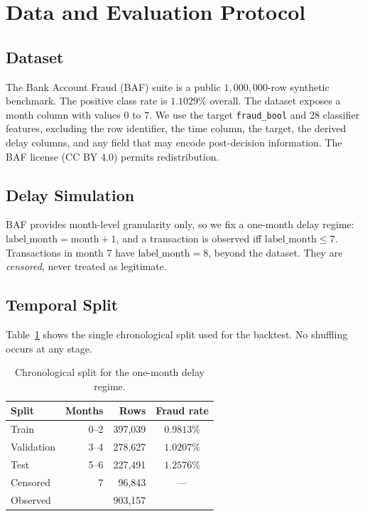 \documentclass[conference]{IEEEtran}
\begin{document}
\section{Data and Evaluation Protocol}
\label{sec:data}

\subsection{Dataset}

The Bank Account Fraud (BAF) suite \cite{jesus2022} is a public
$1{,}000{,}000$-row synthetic benchmark. The positive class rate is
$1.1029\%$ overall. The dataset exposes a month column with values $0$ to
$7$. We use the target \texttt{fraud\_bool} and 28 classifier features,
excluding the row identifier, the time column, the target, the derived delay
columns, and any field that may encode post-decision information. The BAF
license (CC BY 4.0) permits redistribution.

\subsection{Delay Simulation}

BAF provides month-level granularity only, so we fix a one-month delay
regime: $\text{label\_month} = \text{month} + 1$, and a transaction is
observed iff $\text{label\_month} \leq 7$. Transactions in month 7 have
$\text{label\_month} = 8$, beyond the dataset. They are \emph{censored},
never treated as legitimate.

\subsection{Temporal Split}

Table~\ref{tab:split} shows the single chronological split used for the
backtest. No shuffling occurs at any stage.

\begin{table}[!t]
\caption{Chronological split for the one-month delay regime.}
\label{tab:split}
\centering
\small
\begin{tabular}{lrrc}
\toprule
Split & Months & Rows & Fraud rate \\
\midrule
Train      & 0--2 & 397{,}039 & $0.9813\%$ \\
Validation & 3--4 & 278{,}627 & $1.0207\%$ \\
Test       & 5--6 & 227{,}491 & $1.2576\%$ \\
Censored   & 7    & 96{,}843  & --- \\
\midrule
Observed   &      & 903{,}157 & \\
\bottomrule
\end{tabular}
\end{table}
\end{document}
